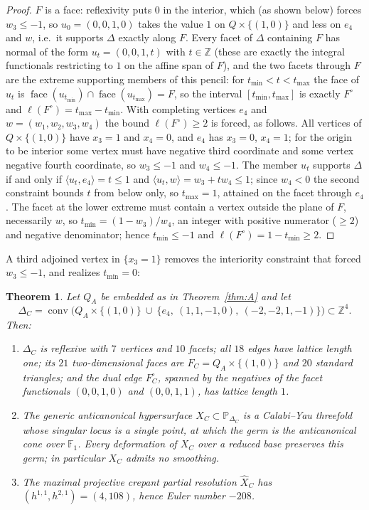 \documentclass[11pt]{amsart}
\newtheorem{theorem}{Theorem}[section]
\theoremstyle{definition}
\theoremstyle{remark}
\newcommand{\ZZ}{\mathbb{Z}}
\newcommand{\PP}{\mathbb{P}}
\newcommand{\conv}{\operatorname{conv}}
\newcommand{\FF}{\mathbb{F}}
\begin{document}
\begin{proof}
$F$ is a face: reflexivity puts $0$ in the interior, which (as shown
below) forces $w_3 \le -1$, so $u_0 = (0,0,1,0)$ takes the value $1$ on
$Q\times\{(1,0)\}$ and less on $e_4$ and $w$, i.e.\ it supports
$\Delta$ exactly along $F$.  Every facet of $\Delta$ containing
$F$ has normal of the form $u_t = (0,0,1,t)$ with
$t \in \ZZ$ (these are exactly the integral functionals restricting to $1$
on the affine span of $F$), and the two facets through $F$ are the extreme
supporting members of this pencil: for
$t_{\min} < t < t_{\max}$ the face of $u_t$ is
$\operatorname{face}(u_{t_{\min}}) \cap \operatorname{face}(u_{t_{\max}})
= F$, so the interval $[t_{\min}, t_{\max}]$ is exactly $F^\circ$ and
$\ell(F^\circ) = t_{\max} - t_{\min}$.  With completing vertices $e_4$ and
$w = (w_1,w_2,w_3,w_4)$ the bound $\ell(F^\circ)\ge 2$ is forced, as
follows.  All vertices of $Q\times\{(1,0)\}$ have $x_3 = 1$ and $x_4 = 0$,
and $e_4$ has $x_3 = 0$, $x_4=1$; for the origin to be interior some
vertex must have negative third coordinate and some vertex negative
fourth coordinate, so
$w_3 \le -1$ and $w_4 \le -1$.  The member $u_t$ supports $\Delta$ if and
only if $\langle u_t, e_4\rangle = t \le 1$ and
$\langle u_t, w\rangle = w_3 + t w_4 \le 1$; since $w_4 < 0$ the second
constraint bounds $t$ from below only, so $t_{\max} = 1$, attained on the
facet through $e_4$.  The facet at the lower extreme must contain a vertex
outside the plane of $F$, necessarily $w$, so
$t_{\min} = (1-w_3)/w_4$, an integer with positive numerator ($\ge 2$) and
negative denominator; hence $t_{\min} \le -1$ and
$\ell(F^\circ) = 1 - t_{\min} \ge 2$.
\end{proof}

A third adjoined vertex in $\{x_3 = 1\}$ removes the interiority constraint
that forced $w_3 \le -1$, and realizes $t_{\min} = 0$:

\begin{theorem}\label{thm:C}
Let $Q_A$ be embedded as in Theorem~\textup{\ref{thm:A}} and let
\[
\Delta_C=\conv\bigl(Q_A\times\{(1,0)\}\ \cup\ \{e_4,\ (1,1,-1,0),\
(-2,-2,1,-1)\}\bigr)\subset\ZZ^4 .
\]
Then:
\begin{enumerate}
\item $\Delta_C$ is reflexive with $7$ vertices and $10$ facets; all $18$
edges have lattice length one; its $21$ two-dimensional faces are
$F_C = Q_A\times\{(1,0)\}$ and $20$ standard triangles; and the dual edge
$F_C^\circ$, spanned by the negatives of the facet functionals
$(0,0,1,0)$ and $(0,0,1,1)$, has lattice length $1$.
\item The generic anticanonical hypersurface $X_C \subset \PP_{\Delta_C}$ is
a Calabi--Yau threefold whose singular locus is a \emph{single} point, at
which the germ is the anticanonical cone over $\FF_1$.  Every deformation of
$X_C$ over a reduced base preserves this germ; in particular
$X_C$ admits no smoothing.
\item The maximal projective crepant partial resolution $\widehat X_C$ has
$(h^{1,1},h^{2,1}) = (4,108)$, hence Euler number $-208$.
\end{enumerate}
\end{theorem}
\end{document}
